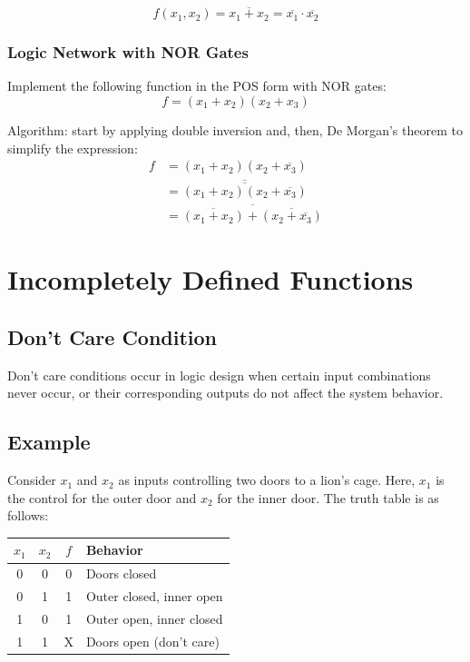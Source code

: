 \documentclass[12pt,openany]{book}
\begin{document}
			      	$$f(x_1, x_2) = \overline{x_1 + x_2} = \overline{x_1} \cdot \overline{x_2}$$
			      	
			      	        
			      	
			      	\subsubsection*{Logic Network with NOR Gates}
			      	Implement the following function in the POS form with NOR gates:
			      	\begin{equation}
			      		f = (x_1 + x_2)(x_2 + x_3)
			      	\end{equation}
			      	
			      	Algorithm: start by applying double inversion and, then, De Morgan's theorem to simplify the expression:
			      	\begin{align}
			      		f & = (x_1 + x_2)(x_2 + \overline{x_3})                                     \\
			      		  & = \overline{\overline{(x_1 + x_2)(x_2 + \overline{x_3})}}               \\
			      		  & = \overline{\overline{(x_1 + x_2)} + \overline{(x_2 + \overline{x_3})}} 
			      	\end{align}
			      	\section{Incompletely Defined Functions}
			      	\subsection{Don't Care Condition}
			      	Don't care conditions occur in logic design when certain input combinations never occur, or their corresponding outputs do not affect the system behavior. 
			      	
			      	\subsection{Example}
			      	Consider \( x_1 \) and \( x_2 \) as inputs controlling two doors to a lion's cage. Here, \( x_1 \) is the control for the outer door and \( x_2 \) for the inner door. The truth table is as follows:
			      	
			      	\begin{center}
			      		\begin{tabular}{cc|c|l}
			      			\( x_1 \) & \( x_2 \) & \( f \) & Behavior                 \\
			      			\hline
			      			0         & 0         & 0       & Doors closed             \\
			      			0         & 1         & 1       & Outer closed, inner open \\
			      			1         & 0         & 1       & Outer open, inner closed \\
			      			1         & 1         & X       & Doors open (don't care)  \\
			      		\end{tabular}
			      	\end{center}
			      	
\end{document}
